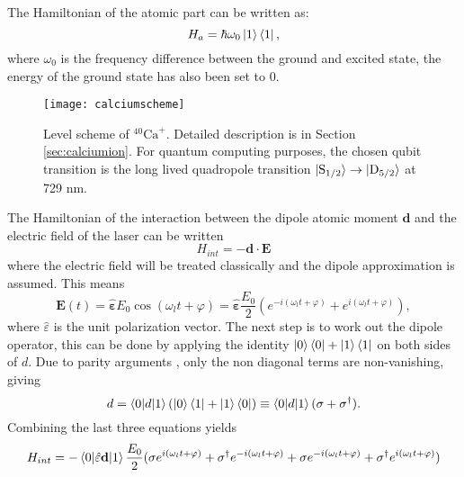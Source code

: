 The Hamiltonian of the atomic part can be written as:
\begin{equation}
H_a = \hbar\omega_0 \ket{1}\bra{1},
\end{equation}
where $\omega_0$ is the frequency difference between the ground and excited state, the energy of the ground state has also been set to 0. \begin{figure}
\centering
\texttt{[image: calciumscheme]}
\caption{Level scheme of $^{40}\text{Ca}^+$. Detailed description is in Section \ref{sec:calciumion}. For quantum computing purposes, the chosen qubit transition is the long lived quadropole transition $\ket{\text{S}_{1/2}} \to \ket{\text{D}_{5/2}}$ at 729 nm.}
\label{qubitschemereference}
\end{figure}
The Hamiltonian of the interaction between the dipole atomic moment $\mathbf{d}$ and the electric field of the laser can be written \cite{steck}
\begin{equation}
H_{int} = -\mathbf{d}\cdot \mathbf{E}
\end{equation}
where the electric field will be treated classically and the dipole approximation is assumed. This means
\begin{equation}
\mathbf{E}(t) = \hat{\mathbf{\varepsilon}} E_0 \cos(\omega_l t+\varphi) = \hat{\mathbf{\varepsilon}} \frac{E_0}{2} \left(e^{-i(\omega_l t+\varphi)} + e^{i(\omega_l t+\varphi)}\right),
\end{equation}
where $\hat{\varepsilon}$ is the unit polarization vector. The next step is to work out the dipole operator, this can be done by applying the identity $\ket{0}\bra{0} + \ket{1}\bra{1}$ on both sides of $d$. Due to parity arguments \cite{steck}, only the non diagonal terms are non-vanishing, giving
\begin{equation}
d = \braket{0|d|1}\left(\ket{0}\bra{1} + \ket{1}\bra{0}\right) \equiv \braket{0|d|1}(\sigma + \sigma^\dagger).
\end{equation}
Combining the last three equations yields
\begin{equation}
\label{eq:hint}
H_{int} = - \braket{0|\hat{\varepsilon} \mathbf{d}|1}\frac{E_0}{2}(\sigma e^{i(\omega_l t+\varphi)} + \sigma^\dagger e^{-i(\omega_l t+\varphi)} + \sigma e^{-i(\omega_l t+\varphi)} + \sigma^\dagger e^{i(\omega_l t+\varphi)})
\end{equation}
